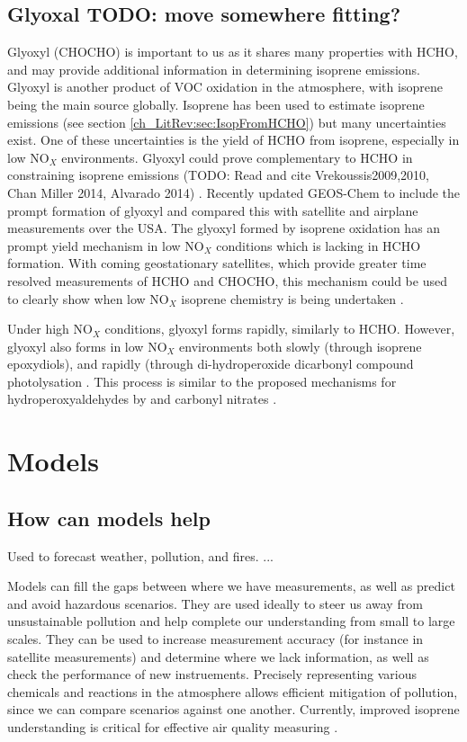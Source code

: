   \subsection{Glyoxal TODO: move somewhere fitting?}
    Glyoxyl (CHOCHO) is important to us as it shares many properties with HCHO, and may provide additional information in determining isoprene emissions.
    Glyoxyl is another product of VOC oxidation in the atmosphere, with isoprene being the main source globally.
    Isoprene has been used to estimate isoprene emissions (see section \ref{ch_LitRev:sec:IsopFromHCHO}) but many uncertainties exist.
    One of these uncertainties is the yield of HCHO from isoprene, especially in low NO$_X$ environments.
    Glyoxyl could prove complementary to HCHO in constraining isoprene emissions (TODO: Read and cite Vrekoussis2009,2010, Chan Miller 2014, Alvarado 2014) \citep{Miller2017}.
    Recently \cite{Miller2017} updated GEOS-Chem to include the prompt formation of glyoxyl and compared this with satellite and airplane measurements over the USA.
    The glyoxyl formed by isoprene oxidation has an prompt yield mechanism in low NO$_X$ conditions which is lacking in HCHO formation.
    With coming geostationary satellites, which provide greater time resolved measurements of HCHO and CHOCHO, this mechanism could be used to clearly show when low NO$_X$ isoprene chemistry is being undertaken \citep{Miller2017}.
    
    Under high NO$_X$ conditions, glyoxyl forms rapidly, similarly to HCHO.
    However, glyoxyl also forms in low NO$_X$ environments both slowly (through isoprene epoxydiols), and rapidly (through di-hydroperoxide dicarbonyl compound photolysation \citep{Crounse2013}.
    This process is similar to the proposed mechanisms for hydroperoxyaldehydes by \citet{Peeters2014} and carbonyl nitrates \citep{Muller2014}.
    
\section{Models}
  
  \subsection{How can models help}
    Used to forecast weather, pollution, and fires. ...
    
    Models can fill the gaps between where we have measurements, as well as predict and avoid hazardous scenarios.
    They are used ideally to steer us away from unsustainable pollution and help complete our understanding from small to large scales.
    They can be used to increase measurement accuracy (for instance in satellite measurements) and determine where we lack information, as well as check the performance of new instruements.
    Precisely representing various chemicals and reactions in the atmosphere allows efficient mitigation of pollution, since we can compare scenarios against one another.
    Currently, improved isoprene understanding is critical for effective air quality measuring \citep{Marvin2017}.
    
